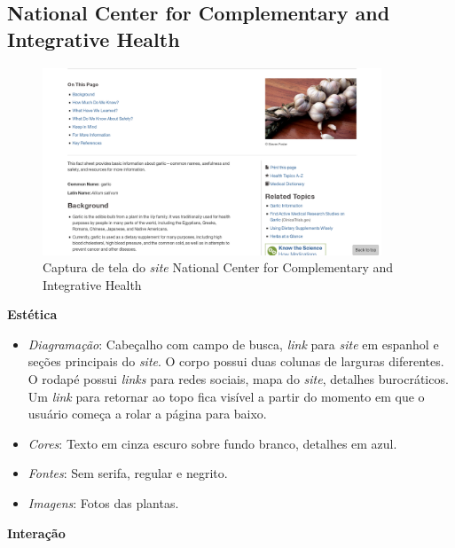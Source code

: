 \subsection{National Center for Complementary and Integrative Health}\label{national-center-for-complementary-and-integrative-health}

\begin{figure}
\centering
\caption{\label{fig-ncihh}Captura de tela do \emph{site} National Center for Complementary and Integrative Health}
\includegraphics[width=0.9\textwidth]{images/similares/nccih.png}
\end{figure}

\textbf{Estética}

\begin{itemize}
\item
  \emph{Diagramação}: Cabeçalho com campo de busca, \emph{link} para \emph{site} em espanhol e seções principais do \emph{site}. O corpo possui duas colunas de larguras diferentes. O rodapé possui \emph{links} para redes sociais, mapa do \emph{site}, detalhes burocráticos. Um \emph{link} para retornar ao topo fica visível a partir do momento em que o usuário começa a rolar a página para baixo.
\item
  \emph{Cores}: Texto em cinza escuro sobre fundo branco, detalhes em azul.
\item
  \emph{Fontes}: Sem serifa, regular e negrito.
\item
  \emph{Imagens}: Fotos das plantas.
\end{itemize}

\textbf{Interação}


